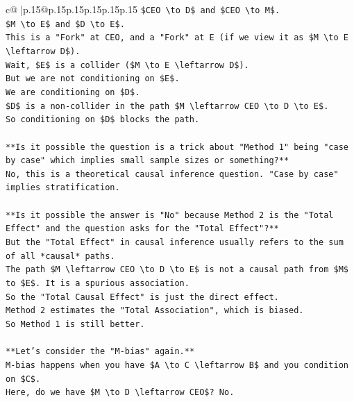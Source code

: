 \documentclass{article}
\begin{document}
{\begin{supertabular}{c@{$\;$}|p{.15\linewidth}@{}p{.15\linewidth}p{.15\linewidth}p{.15\linewidth}p{.15\linewidth}p{.15\linewidth}}
{{{\texttt{\$CEO \textbackslash{}to D\$ and \$CEO \textbackslash{}to M\$.} \\
\texttt{\$M \textbackslash{}to E\$ and \$D \textbackslash{}to E\$.} \\
\texttt{This is a "Fork" at CEO, and a "Fork" at E (if we view it as \$M \textbackslash{}to E \textbackslash{}leftarrow D\$).} \\
\texttt{Wait, \$E\$ is a collider (\$M \textbackslash{}to E \textbackslash{}leftarrow D\$).} \\
\texttt{But we are not conditioning on \$E\$.} \\
\texttt{We are conditioning on \$D\$.} \\
\texttt{\$D\$ is a non{-}collider in the path \$M \textbackslash{}leftarrow CEO \textbackslash{}to D \textbackslash{}to E\$.} \\
\texttt{So conditioning on \$D\$ blocks the path.} \\
\\ 
\texttt{**Is it possible the question is a trick about "Method 1" being "case by case" which implies small sample sizes or something?**} \\
\texttt{No, this is a theoretical causal inference question. "Case by case" implies stratification.} \\
\\ 
\texttt{**Is it possible the answer is "No" because Method 2 is the "Total Effect" and the question asks for the "Total Effect"?**} \\
\texttt{But the "Total Effect" in causal inference usually refers to the sum of all *causal* paths.} \\
\texttt{The path \$M \textbackslash{}leftarrow CEO \textbackslash{}to D \textbackslash{}to E\$ is not a causal path from \$M\$ to \$E\$. It is a spurious association.} \\
\texttt{So the "Total Causal Effect" is just the direct effect.} \\
\texttt{Method 2 estimates the "Total Association", which is biased.} \\
\texttt{So Method 1 is still better.} \\
\\ 
\texttt{**Let's consider the "M{-}bias" again.**} \\
\texttt{M{-}bias happens when you have \$A \textbackslash{}to C \textbackslash{}leftarrow B\$ and you condition on \$C\$.} \\
\texttt{Here, do we have \$M \textbackslash{}to D \textbackslash{}leftarrow CEO\$? No.} \\
}}}
\end{supertabular}}
\end{document}
